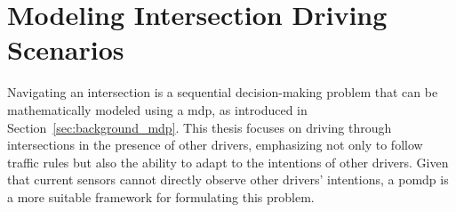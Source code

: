 \newcommand {\matr}[2]{\left[\begin{array}{#1}#2\end{array}\right]}
\newcommand{\E}{\mathbb{E}}
\newcommand{\tr}{\mathrm{tr}}
\newcommand{\x}{{\mathbf{x}}}
\renewcommand{\u}{{\mathbf{u}}}
\newcommand{\w}{{\mathbf{w}}}
\renewcommand{\r}{{\mathbf{r}}}

\chapter{Modeling Intersection Driving Scenarios}
\label{ch:modeling_intersection}

Navigating an intersection is a sequential decision-making problem that can be mathematically modeled using a \gls{mdp}, as introduced in Section~\ref{sec:background_mdp}. This thesis focuses on driving through intersections in the presence of other drivers, emphasizing not only to follow traffic rules but also the ability to adapt to the intentions of other drivers. Given that current sensors cannot directly observe other drivers' intentions, a \gls{pomdp} is a more suitable framework for formulating this problem.


 

